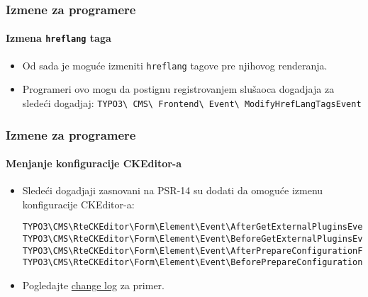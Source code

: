 
\begin{frame}[fragile]
	\frametitle{Izmene za programere}
	\framesubtitle{Izmena \texttt{hreflang} taga}

	\lstset{basicstyle=\smaller\ttfamily}

	\begin{itemize}
		\item Od sada je moguće izmeniti \texttt{hreflang} tagove pre njihovog renderanja.
		\item Programeri ovo mogu da postignu registrovanjem slušaoca dogadjaja za sledeći dogadjaj:\newline
			\smaller
				\texttt{TYPO3\textbackslash
					CMS\textbackslash
					Frontend\textbackslash
					Event\textbackslash
					ModifyHrefLangTagsEvent}
			\normalsize
	\end{itemize}

\end{frame}


\begin{frame}[fragile]
	\frametitle{Izmene za programere}
	\framesubtitle{Menjanje konfiguracije CKEditor-a}

	\lstset{basicstyle=\tiny\ttfamily}

	\begin{itemize}
		\item Sledeći dogadjaji zasnovani na PSR-14 su dodati da omoguće izmenu konfiguracije CKEditor-a:

\vspace{-0.4cm}
\begin{lstlisting}
TYPO3\CMS\RteCKEditor\Form\Element\Event\AfterGetExternalPluginsEvent
TYPO3\CMS\RteCKEditor\Form\Element\Event\BeforeGetExternalPluginsEvent
TYPO3\CMS\RteCKEditor\Form\Element\Event\AfterPrepareConfigurationForEditorEvent
TYPO3\CMS\RteCKEditor\Form\Element\Event\BeforePrepareConfigurationForEditorEvent
\end{lstlisting}

		\item Pogledajte
			\href{https://docs.typo3.org/c/typo3/cms-core/master/en-us/Changelog/10.3/Feature-88818-IntroduceEventsToModifyCKEditorConfiguration.html}{change log}
			za primer.
	\end{itemize}

\end{frame}

